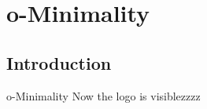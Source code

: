 

\section{o-Minimality}
\subsection{Introduction}


\begin{frame}{o-Minimality}
	Now the logo is visiblezzzz
\end{frame}